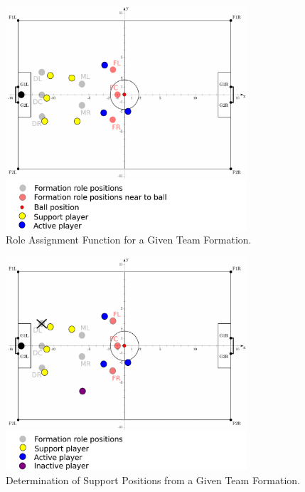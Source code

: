 \begin{figure}[t!]
\centering
  \includegraphics[width=0.8\textwidth]{Chapter4/figures/RoleAss.pdf}
  \caption{Role Assignment Function for a Given Team Formation.} 
  \label{fig:RoleAss}
\end{figure}


\begin{figure}[t!]
\centering
  \includegraphics[width=0.8\textwidth]{Chapter4/figures/SupportPos.pdf}
  \caption{Determination of Support Positions from a Given Team Formation.} 
  \label{fig:SupportPos}
\end{figure}

